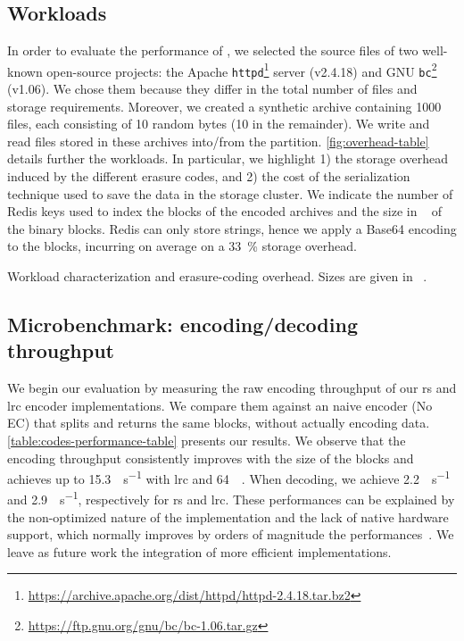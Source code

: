 \subsection{Workloads}
\label{sec:eval:workloads}
In order to evaluate the performance of \SYS, we selected the source files of two well-known open-source projects: the Apache \texttt{httpd}\footnote{\url{https://archive.apache.org/dist/httpd/httpd-2.4.18.tar.bz2}} server (v2.4.18) and GNU \texttt{bc}\footnote{\url{https://ftp.gnu.org/gnu/bc/bc-1.06.tar.gz}} (v1.06). 
We chose them because they differ in the total number of files and storage requirements.
Moreover, we created a synthetic archive containing 1000 files, each consisting of 10 random bytes (\SI{10}{\byte} in the remainder).
We write and read files stored in these archives into/from the \SYS partition. 
\autoref{fig:overhead-table} details further the workloads.
In particular, we highlight 1) the storage overhead induced by the different erasure codes, and 2) the cost of the serialization technique used to save the data in the storage cluster.
We indicate the number of Redis keys used to index the blocks of the encoded archives and the size in \si{\mega\byte} of the binary blocks. 
Redis can only store strings, hence we apply a Base64 encoding to the blocks, incurring on average on a \SI{33}{\percent} storage overhead.

\begin{table}
    \centering
    \caption{Workload characterization and erasure-coding overhead. Sizes are given in \si{\mega\byte}.}
    
    \label{fig:overhead-table}
\end{table}

\subsection{Microbenchmark: encoding/decoding throughput}%
\label{subsec:rw-perf}
We begin our evaluation by measuring the raw encoding throughput of our \ac{rs} and \ac{lrc} encoder implementations.
We compare them against an naive encoder (No EC) that splits and returns the same blocks, without actually encoding data.
\autoref{table:codes-performance-table} presents our results.
We observe that the encoding throughput consistently improves with the size of the blocks and achieves up to 15.3\si{\mega\byte\per\second} with \ac{lrc} and \SI{64}{\mega\byte}.
When decoding, we achieve 2.2\si{\mega\byte\per\second} and 2.9\si{\mega\byte\per\second}, respectively for \ac{rs} and \ac{lrc}.
These performances can be explained by the non-optimized nature of the implementation and the lack of native hardware support, which normally improves by orders of magnitude the performances~\cite{Burihabwa2016}. 
We leave as future work the integration of more efficient implementations.

